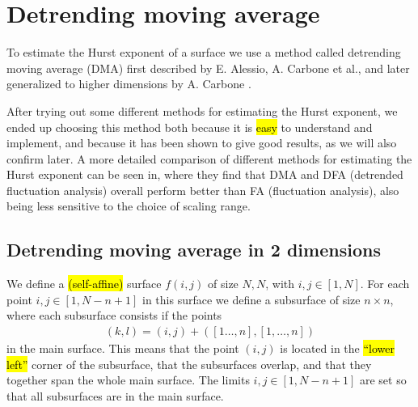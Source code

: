 \section{Detrending moving average}
To estimate the Hurst exponent of a surface we use a method called detrending moving average (DMA) first described by E. Alessio, A. Carbone et al.\cite{alessio2002dma}, and later generalized to higher dimensions by A. Carbone \cite{carbone2007algorithm}. 

After trying out some different methods for estimating the Hurst exponent, we ended up choosing this method both because it is \hl{easy} to understand and implement, and because it has been shown to give good results, as we will also confirm later. A more detailed comparison of different methods for estimating the Hurst exponent can be seen in\cite{shao2012comparing}, where they find that DMA and DFA (detrended fluctuation analysis) overall perform better than FA (fluctuation analysis), also being less sensitive to the choice of scaling range.


\subsection{Detrending moving average in 2 dimensions}

We define a \hl{(self-affine)} surface $f(i,j)$ of size $N,N$, with $i,j \in [1,N]$. For each point $i,j \in [1,N-n+1]$ in this surface we define a subsurface of size $n\times n$, where each subsurface consists if the points
\begin{align*}
    (k,l) = (i,j) + \left([1\dots,n], [1,\dots,n]\right)%
\end{align*}
in the main surface. This means that the point $(i,j)$ is located in the \hl{``lower left''} corner of the subsurface, that the subsurfaces overlap, and that they together span the whole main surface. The limits $i,j \in [1,N-n+1]$ are set so that all subsurfaces are in the main surface.

